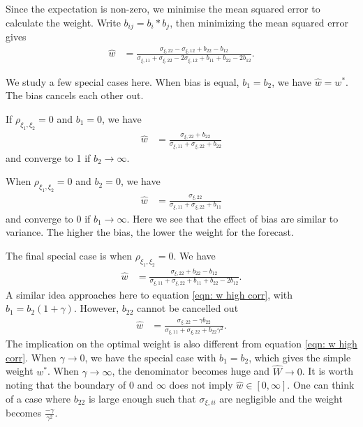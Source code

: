 \documentclass[11pt]{article}
\begin{document}
Since the expectation is non-zero, we minimise the mean squared error to calculate the weight.
Write \(b_{ij}=b_i*b_j\), then minimizing the mean squared error gives
\begin{equation}
\label{eqn: w bias}
\begin{aligned}
\hat{w} &= \frac{\sigma_{\xi,22}-\sigma_{\xi,12}+b_{22}-b_{12}}{\sigma_{\xi,11}+\sigma_{\xi,22}-2\sigma_{\xi,12}+b_{11}+b_{22}-2b_{12}}.
\end{aligned}
\end{equation}

We study a few special cases here. When bias is equal, $b_1=b_2$, we have $\hat{w}=w^*$. The bias cancels each other out. 

If $\rho_{\xi_1,\xi_2}=0$ and $b_1=0$, we have
\begin{equation}
\begin{aligned}
\hat{w} &= \frac{\sigma_{\xi,22}+b_{22}}{\sigma_{\xi,11}+\sigma_{\xi,22}+b_{22}}
\end{aligned}
\end{equation}
and converge to 1 if $b_2 \to \infty$.

When $\rho_{\xi_1,\xi_2}=0$ and $b_2=0$, we have
\begin{equation}
\begin{aligned}
\hat{w} &= \frac{\sigma_{\xi,22}}{\sigma_{\xi,11}+\sigma_{\xi,22}+b_{11}}
\end{aligned}
\end{equation}
and converge to 0 if $b_1 \to \infty$. Here we see that the effect of bias are similar to variance. The higher the bias, the lower the weight for the forecast.

The final special case is when $\rho_{\xi_1,\xi_2}=0$. We have
\begin{equation}
\begin{aligned}
\hat{w} &= \frac{\sigma_{\xi,22}+b_{22}-b_{12}}{\sigma_{\xi,11}+\sigma_{\xi,22}+b_{11}+b_{22}-2b_{12}}.
\end{aligned}
\end{equation}
A similar idea approaches here to equation \ref{eqn: w high corr}, with $b_1 = b_2 (1+\gamma)$. However, $b_{22}$ cannot be cancelled out
\begin{equation}
\begin{aligned}
\hat{w} &= \frac{\sigma_{\xi,22}-\gamma b_{22}}{\sigma_{\xi,11}+\sigma_{\xi,22}+b_{22}\gamma^2}.
\end{aligned}
\end{equation}
The implication on the optimal weight is also different from equation \ref{eqn: w high corr}. When $\gamma \to 0$, we have the special case with $b_1=b_2$, which gives the simple weight $w^*$. When $\gamma \to \infty$, the denominator becomes huge and $\hat{W} \to 0$. It is worth noting that the boundary of 0 and $\infty$ does not imply $\hat{w} \in [0,\infty]$. One can think of a case where $b_{22}$ is large enough such that $\sigma_{\xi,ii}$ are negligible and the weight becomes $\frac{-\gamma}{\gamma^2}$. 
\end{document}
